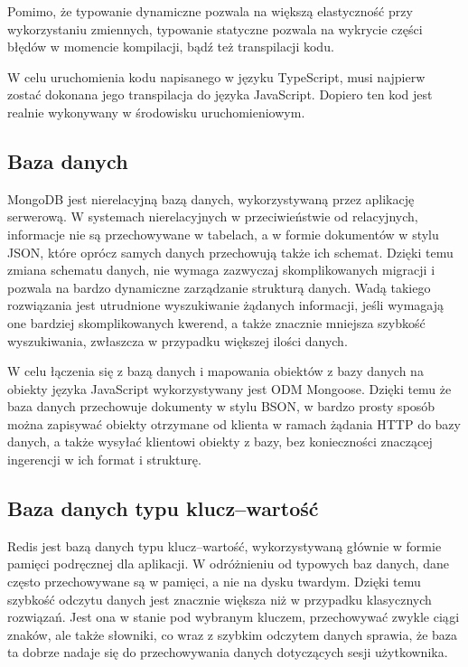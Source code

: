 \documentclass[a4paper,12pt,twoside,openany]{report}
\begin{document}
Pomimo, że typowanie dynamiczne pozwala na większą elastyczność przy wykorzystaniu zmiennych, typowanie statyczne pozwala na wykrycie części błędów w momencie kompilacji, bądź też transpilacji kodu.

W celu uruchomienia kodu napisanego w języku TypeScript, musi najpierw zostać dokonana jego transpilacja do języka JavaScript. Dopiero ten kod jest realnie wykonywany w środowisku uruchomieniowym.

\subsection{Baza danych}
MongoDB jest nierelacyjną bazą danych, wykorzystywaną przez aplikację serwerową. W systemach nierelacyjnych w przeciwieństwie od relacyjnych, informacje nie są przechowywane w tabelach, a w formie dokumentów w stylu JSON, które oprócz samych danych przechowują także ich schemat. Dzięki temu zmiana schematu danych, nie wymaga zazwyczaj skomplikowanych migracji i pozwala na bardzo dynamiczne zarządzanie strukturą danych. Wadą takiego rozwiązania jest utrudnione wyszukiwanie żądanych informacji, jeśli wymagają one bardziej skomplikowanych kwerend, a także znacznie mniejsza szybkość wyszukiwania, zwłaszcza w przypadku większej ilości danych. 

W celu łączenia się z bazą danych i mapowania obiektów z bazy danych na obiekty języka JavaScript wykorzystywany jest ODM Mongoose. Dzięki temu że baza danych przechowuje dokumenty w stylu BSON, w bardzo prosty sposób można zapisywać obiekty otrzymane od klienta w ramach żądania HTTP do bazy danych, a także wysyłać klientowi obiekty z bazy, bez konieczności znaczącej ingerencji w ich format i strukturę.

\subsection{Baza danych typu klucz--wartość}
Redis jest bazą danych typu klucz--wartość, wykorzystywaną głównie w formie pamięci podręcznej dla aplikacji. W odróżnieniu od typowych baz danych, dane często przechowywane są w pamięci, a nie na dysku twardym. Dzięki temu szybkość odczytu danych jest znacznie większa niż w przypadku klasycznych rozwiązań.
Jest ona w stanie pod wybranym kluczem, przechowywać zwykle ciągi znaków, ale także słowniki, co wraz z szybkim odczytem danych sprawia, że baza ta dobrze nadaje się do przechowywania danych dotyczących sesji użytkownika.
\end{document}
